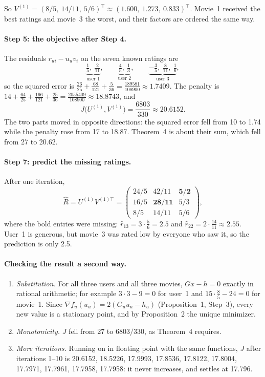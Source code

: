 \documentclass[11pt]{article}
\theoremstyle{definition}
\newcommand{\T}{^{\top}}
\begin{document}
So $V^{(1)} = (8/5,\ 14/11,\ 5/6)\T \approx (1.600,\ 1.273,\ 0.833)\T$. Movie~1 received the best
ratings and movie~3 the worst, and their factors are ordered the same way.

\paragraph{Step 5: the objective after Step 4.} The residuals $r_{ui} - u_u v_i$ on the seven known
ratings are
\[
\underbrace{\tfrac15,\ \tfrac{2}{11}}_{\text{user 1}},\qquad
\underbrace{\tfrac45,\ \tfrac13}_{\text{user 2}},\qquad
\underbrace{-\tfrac35,\ \tfrac{8}{11},\ \tfrac16}_{\text{user 3}},
\]
so the squared error is $\tfrac{26}{25} + \tfrac{68}{121} + \tfrac{5}{36}
= \tfrac{189581}{108900} \approx 1.7409$. The penalty is
$14 + \tfrac{64}{25} + \tfrac{196}{121} + \tfrac{25}{36} = \tfrac{2055409}{108900} \approx 18.8743$,
and
\[
J\bigl(U^{(1)}, V^{(1)}\bigr) = \frac{6803}{330} \approx 20.6152.
\]
The two parts moved in opposite directions: the squared error fell from 10 to 1.74 while the
penalty rose from 17 to 18.87. Theorem~4 is about their sum, which fell from 27 to 20.62.

\paragraph{Step 7: predict the missing ratings.} After one iteration,
\[
\hat R = U^{(1)} V^{(1)\top} =
\begin{pmatrix} 24/5 & 42/11 & \mathbf{5/2} \\ 16/5 & \mathbf{28/11} & 5/3 \\ 8/5 & 14/11 & 5/6 \end{pmatrix},
\]
where the bold entries were missing: $\hat r_{13} = 3 \cdot \tfrac56 = 2.5$ and
$\hat r_{22} = 2 \cdot \tfrac{14}{11} \approx 2.55$. User~1 is generous, but movie~3 was rated low
by everyone who saw it, so the prediction is only 2.5.

\paragraph{Checking the result a second way.}
\begin{enumerate}[label=(\alph*), leftmargin=*]
  \item \emph{Substitution.} For all three users and all three movies, $Gx - h = 0$ exactly in
        rational arithmetic; for example $3\cdot 3 - 9 = 0$ for user~1 and
        $15 \cdot \tfrac85 - 24 = 0$ for movie~1. Since $\nabla f_u(u_u) = 2(G_u u_u - h_u)$
        (Proposition~1, Step~3), every new value is a stationary point, and by Proposition~2 the
        unique minimizer.
  \item \emph{Monotonicity.} $J$ fell from 27 to $6803/330$, as Theorem~4 requires.
  \item \emph{More iterations.} Running on in floating point with the same functions, $J$ after
        iterations 1--10 is 20.6152, 18.5226, 17.9993, 17.8536, 17.8122, 17.8004, 17.7971,
        17.7961, 17.7958, 17.7958: it never increases, and settles at 17.796.
\end{enumerate}
\end{document}
